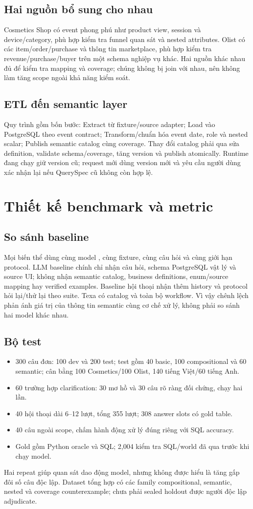 \documentclass[11pt,a4paper]{article}
\begin{document}
\subsection{Hai nguồn bổ sung cho nhau}
Cosmetics Shop có event phong phú như product view, session và device/category, phù hợp kiểm tra funnel quan sát và nested attributes. Olist có các item/order/purchase và thông tin marketplace, phù hợp kiểm tra revenue/purchase/buyer trên một schema nghiệp vụ khác. Hai nguồn khác nhau đủ để kiểm tra mapping và coverage; chúng không bị join với nhau, nên không làm tăng scope ngoài khả năng kiểm soát.
\subsection{ETL đến semantic layer}
Quy trình gồm bốn bước: Extract từ fixture/source adapter; Load vào PostgreSQL theo event contract; Transform/chuẩn hóa event date, role và nested scalar; Publish semantic catalog cùng coverage. Thay đổi catalog phải qua sửa definition, validate schema/coverage, tăng version và publish atomically. Runtime đang chạy giữ version cũ; request mới dùng version mới và yêu cầu người dùng xác nhận lại nếu QuerySpec cũ không còn hợp lệ.

\section{Thiết kế benchmark và metric}
\subsection{So sánh baseline}
Mọi biến thể dùng cùng model , cùng fixture, cùng câu hỏi và cùng giới hạn protocol. LLM baseline chính chỉ nhận câu hỏi, schema PostgreSQL vật lý và source UI; không nhận semantic catalog, business definitions, enum/source mapping hay verified examples. Baseline hội thoại nhận thêm history và protocol hỏi lại/thử lại theo suite. Texa có catalog và toàn bộ workflow. Vì vậy chênh lệch phản ánh giá trị của thông tin semantic cùng cơ chế xử lý, không phải so sánh hai model khác nhau.
\subsection{Bộ test}
\begin{itemize}
\item 300 câu đơn: 100 dev và 200 test; test gồm 40 basic, 100 compositional và 60 semantic; cân bằng 100 Cosmetics/100 Olist, 140 tiếng Việt/60 tiếng Anh.
\item 60 trường hợp clarification: 30 mơ hồ và 30 câu rõ ràng đối chứng, chạy hai lần.
\item 40 hội thoại dài 6--12 lượt, tổng 355 lượt; 308 answer slots có gold table.
\item 40 câu ngoài scope, chấm hành động xử lý đúng riêng với SQL accuracy.
\item Gold gồm Python oracle và SQL; 2{,}004 kiểm tra SQL/world đã qua trước khi chạy model.
\end{itemize}
Hai repeat giúp quan sát dao động model, nhưng không được hiểu là tăng gấp đôi số câu độc lập. Dataset tổng hợp có các family compositional, semantic, nested và coverage counterexample; chưa phải sealed holdout được người độc lập adjudicate.
\end{document}
